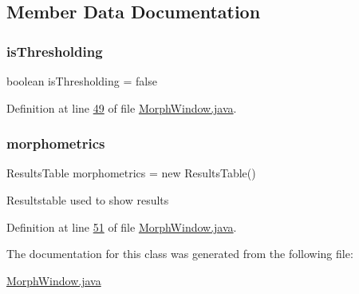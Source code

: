 \subsection{Member Data Documentation}
\hypertarget{classgui_1_1_morph_window_a3c3ae31647b93ff77785eb37236fbcb7}{}\label{classgui_1_1_morph_window_a3c3ae31647b93ff77785eb37236fbcb7} 
\subsubsection{\texorpdfstring{is\+Thresholding}{isThresholding}}
{\footnotesize\ttfamily boolean is\+Thresholding = false\hspace{0.3cm}{\ttfamily [private]}}



Definition at line \hyperlink{_morph_window_8java_source_l00049}{49} of file \hyperlink{_morph_window_8java_source}{Morph\+Window.\+java}.

\hypertarget{classgui_1_1_morph_window_a05b8759be1c0c0351258f5519d12914f}{}\label{classgui_1_1_morph_window_a05b8759be1c0c0351258f5519d12914f} 
\subsubsection{\texorpdfstring{morphometrics}{morphometrics}}
{\footnotesize\ttfamily Results\+Table morphometrics = new Results\+Table()\hspace{0.3cm}{\ttfamily [private]}}

Resultstable used to show results 

Definition at line \hyperlink{_morph_window_8java_source_l00051}{51} of file \hyperlink{_morph_window_8java_source}{Morph\+Window.\+java}.



The documentation for this class was generated from the following file\+:\begin{DoxyCompactItemize}
\item 
\hyperlink{_morph_window_8java}{Morph\+Window.\+java}\end{DoxyCompactItemize}
